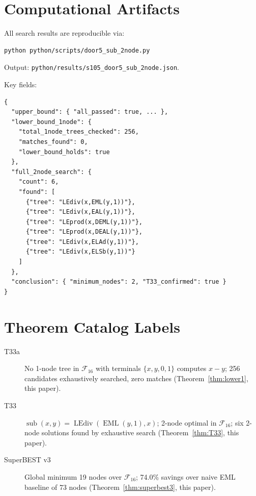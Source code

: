 \documentclass[12pt,a4paper]{article}
\theoremstyle{definition}
\newcommand{\EML}{\operatorname{EML}}
\newcommand{\LEdiv}{\operatorname{LEdiv}}
\newcommand{\sub}{\operatorname{sub}}
\begin{document}
\section*{Computational Artifacts}

All search results are reproducible via:
\begin{verbatim}
python python/scripts/door5_sub_2node.py
\end{verbatim}
Output: \texttt{python/results/s105\_door5\_sub\_2node.json}.

Key fields:
\begin{verbatim}
{
  "upper_bound": { "all_passed": true, ... },
  "lower_bound_1node": {
    "total_1node_trees_checked": 256,
    "matches_found": 0,
    "lower_bound_holds": true
  },
  "full_2node_search": {
    "count": 6,
    "found": [
      {"tree": "LEdiv(x,EML(y,1))"},
      {"tree": "LEdiv(x,EAL(y,1))"},
      {"tree": "LEprod(x,DEML(y,1))"},
      {"tree": "LEprod(x,DEAL(y,1))"},
      {"tree": "LEdiv(x,ELAd(y,1))"},
      {"tree": "LEdiv(x,ELSb(y,1))"}
    ]
  },
  "conclusion": { "minimum_nodes": 2, "T33_confirmed": true }
}
\end{verbatim}

\section*{Theorem Catalog Labels}

\begin{description}
  \item[T33a]  No 1-node tree in $\mathcal{F}_{16}$ with terminals $\{x,y,0,1\}$
               computes $x-y$; 256 candidates exhaustively searched, zero matches
               (Theorem~\ref{thm:lower1}, this paper).
  \item[T33]   $\sub(x,y) = \LEdiv(\EML(y,1), x)$; 2-node optimal in $\mathcal{F}_{16}$;
               six 2-node solutions found by exhaustive search
               (Theorem~\ref{thm:T33}, this paper).
  \item[SuperBEST v3]  Global minimum 19 nodes over $\mathcal{F}_{16}$;
               74.0\% savings over naive EML baseline of 73 nodes
               (Theorem~\ref{thm:superbest3}, this paper).
\end{description}
\end{document}
